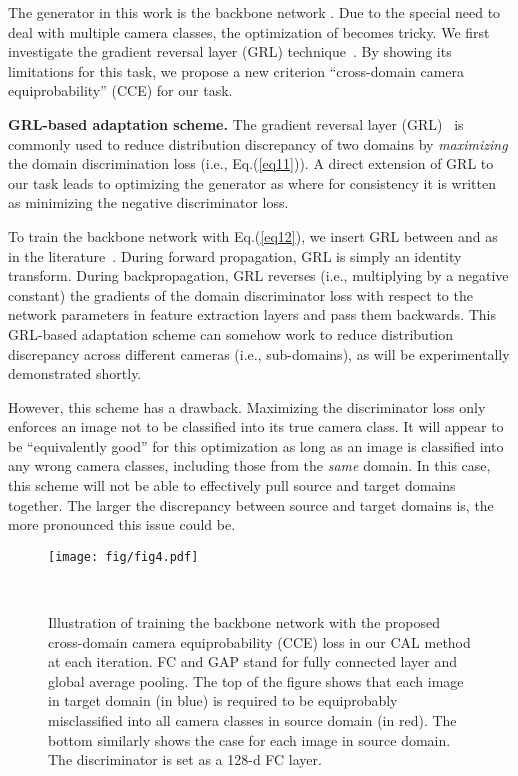 \documentclass[10pt,twocolumn,letterpaper]{article}
\begin{document}
The generator in this work is the backbone network . Due to the special need to deal with multiple camera classes, the optimization of  becomes tricky. We first investigate the gradient reversal layer (GRL) technique~\cite{DBLP:conf/icml/GaninL15}. By showing its limitations for this task, we propose a new criterion ``cross-domain camera equiprobability'' (CCE) for our task. 

\textbf{GRL-based adaptation scheme.} The gradient reversal layer (GRL)~\cite{DBLP:conf/icml/GaninL15} is commonly used to reduce distribution discrepancy of two domains by \textit{maximizing} the domain discrimination loss (i.e., Eq.(\ref{eq11})). A direct extension of GRL to our task leads to optimizing the generator  as
where for consistency it is written as minimizing the negative discriminator loss. 

To train the backbone network  with Eq.(\ref{eq12}), we insert GRL between  and  as in the literature~\cite{DBLP:conf/icml/GaninL15}. During forward propagation, GRL is simply an identity transform. During backpropagation, GRL reverses (i.e., multiplying by a negative constant) the gradients of the domain discriminator loss with respect to the network parameters in feature extraction layers and pass them backwards. This GRL-based adaptation scheme can somehow work to reduce distribution discrepancy across different cameras (i.e., sub-domains), as will be experimentally demonstrated shortly. 

However, this scheme has a drawback. Maximizing the discriminator loss only enforces an image not to be classified into its true camera class. It will appear to be ``equivalently good'' for this optimization as long as an image is classified into any wrong camera classes, including those from the \textit{same} domain. In this case, this scheme will not be able to effectively pull source and target domains together. The larger the discrepancy between source and target domains is, the more pronounced this issue could be. 

\begin{figure}\centering
\texttt{[image: fig/fig4.pdf]}
\caption{Illustration of training the backbone network  with the proposed cross-domain camera equiprobability (CCE) loss in our CAL method at each iteration. FC and GAP stand for fully connected layer and global average pooling. The top of the figure shows that each image in target domain (in blue) is required to be equiprobably misclassified into all camera classes in source domain (in red). The bottom similarly shows the case for each image in source domain. The discriminator is set as a 128-d FC layer.}​
\label{fig3}
\vspace*{-20pt}
\end{figure}
 
\end{document}

